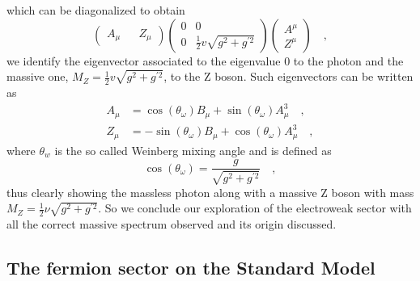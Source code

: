 \documentclass[12pt]{article}
\begin{document}
which can be diagonalized to obtain
\begin{equation}
\begin{pmatrix}
A_\mu && Z_\mu 
\end{pmatrix} \begin{pmatrix}
0  & 0 \\
0  & \frac{1}{2} v \sqrt{g^2 + g^{\prime 2}} 
\end{pmatrix}  \begin{pmatrix}
A^\mu \\ Z^\mu
\end{pmatrix}  \quad , 
\end{equation}
%
we identify the eigenvector associated to the eigenvalue 0 to the photon and the massive one, $ M_Z =  \frac{1}{2} v \sqrt{g^2 + g^{\prime 2}} $, to the Z boson. Such eigenvectors can be written as
%
\begin{align}
A_\mu &=\cos(\theta_\omega) B_\mu + \sin(\theta_\omega) A_\mu^3 \quad ,  \\  
Z_\mu & =- \sin(\theta_\omega) B_\mu + \cos(\theta_\omega) A_\mu^3 \quad , 
\end{align}
%
where $\theta_w$ is the so called Weinberg mixing angle and is defined as
\begin{equation}
\cos(\theta_\omega)=\frac{g}{ \sqrt{g^2 + g^{\prime 2}}} \quad , 
\end{equation}
thus clearly showing the massless photon along with a massive Z boson with mass $M_Z= \frac{1}{2} \nu \sqrt{g^2 + g^{\prime 2}} $. 
%
So we conclude our exploration of the electroweak sector with all the correct massive spectrum observed and its origin discussed.


\subsection{The fermion sector on the Standard Model}
\end{document}

